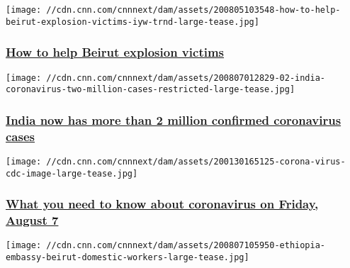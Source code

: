 \href{/2020/08/05/world/help-beirut-explosion-victims-iyw-trnd/index.html}{}

\texttt{[image: //cdn.cnn.com/cnnnext/dam/assets/200805103548-how-to-help-beirut-explosion-victims-iyw-trnd-large-tease.jpg]}

\hypertarget{how-to-help-beirut-explosion-victims-}{%
\subsubsection{\texorpdfstring{\href{/2020/08/05/world/help-beirut-explosion-victims-iyw-trnd/index.html}{How
to help Beirut explosion victims
}}{How to help Beirut explosion victims }}\label{how-to-help-beirut-explosion-victims-}}

\href{/2020/08/07/asia/india-coronavirus-two-million-intl-hnk/index.html}{}

\texttt{[image: //cdn.cnn.com/cnnnext/dam/assets/200807012829-02-india-coronavirus-two-million-cases-restricted-large-tease.jpg]}

\hypertarget{india-now-has-more-than-2-million-confirmed-coronavirus-cases}{%
\subsubsection{\texorpdfstring{\href{/2020/08/07/asia/india-coronavirus-two-million-intl-hnk/index.html}{India
now has more than 2 million confirmed coronavirus
cases}}{India now has more than 2 million confirmed coronavirus cases}}\label{india-now-has-more-than-2-million-confirmed-coronavirus-cases}}

\href{/2020/08/07/world/coronavirus-newsletter-08-07-20-intl/index.html}{}

\texttt{[image: //cdn.cnn.com/cnnnext/dam/assets/200130165125-corona-virus-cdc-image-large-tease.jpg]}

\hypertarget{what-you-need-to-know-about-coronavirus-on-friday-august-7}{%
\subsubsection{\texorpdfstring{\href{/2020/08/07/world/coronavirus-newsletter-08-07-20-intl/index.html}{What
you need to know about coronavirus on Friday, August
7}}{What you need to know about coronavirus on Friday, August 7}}\label{what-you-need-to-know-about-coronavirus-on-friday-august-7}}

\href{/2020/08/07/africa/beirut-domestic-workers-ethiopia-intl/index.html}{}

\texttt{[image: //cdn.cnn.com/cnnnext/dam/assets/200807105950-ethiopia-embassy-beirut-domestic-workers-large-tease.jpg]}

